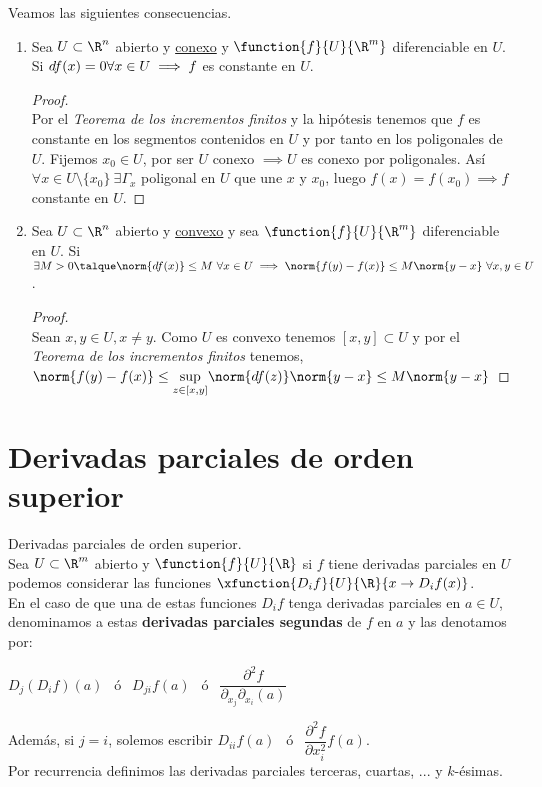 	\newpage
	\begin{corolario} Veamos las siguientes consecuencias.
	\begin{enumerate}[1)]
	\item Sea $U\subset\R^n$ abierto y \underline{conexo} y $\function{f}{U}{\R^m}$ diferenciable en $U$. Si $df(x)=0\\
	\forall x\in U\implies f$ es constante en $U$.
	\begin{proof}\ \\
	Por el \textit{Teorema de los incrementos finitos} y la hipótesis tenemos que $f$ es constante en los segmentos contenidos en $U$ y por tanto en los poligonales de $U$. Fijemos $x_0\in U$, por ser $U$ conexo $\implies U$ es conexo por poligonales. Así $\forall x\in U\setminus\{x_0\}\ \exists\Gamma_x$ poligonal en $U$ que une $x$ y $x_0$, luego $f(x)=f(x_0)\implies f$ constante en $U$.
	\end{proof}
	\item Sea $U\subset\R^n$ abierto y \underline{convexo} y sea $\function{f}{U}{\R^m}$ diferenciable en $U$. Si\\
	$\exists M>0\talque \norm{df(x)}\leq M\ \forall x\in U\implies \norm{f(y)-f(x)}\leq M\norm{y-x}\ \forall x,y\in U$.
	\begin{proof}\ \\
	Sean $x,y\in U, x\neq y$. Como $U$ es convexo tenemos $[x,y]\subset U$ y por el \textit{Teorema de los incrementos finitos} tenemos, $\norm{f(y)-f(x)}\leq \underset{z\in [x,y]}\sup\norm{df(z)}\norm{y-x}\leq M\norm{y-x}$
	\end{proof}
	\end{enumerate}
	\end{corolario}
	
	\section{Derivadas parciales de orden superior}
	
	\begin{defi} Derivadas parciales de orden superior.\\
	Sea $U\subset \R^m$ abierto y $\function{f}{U}{\R}$ si $f$ tiene derivadas parciales en $U$ podemos considerar las funciones $\xfunction{D_if}{U}{\R}{x\to D_if(x)}$.\\
	En el caso de que una de estas funciones $D_if$ tenga derivadas parciales en $a\in U$, denominamos a estas \textbf{derivadas parciales segundas} de $f$ en $a$ y las denotamos por:
	\begin{center} $D_j(D_if)(a)\ \ $ ó $\ \ D_{ji}f(a)\ \ $ ó $\ \ \dfrac{\partial^2f}{\partial_{x_j}\partial_{x_i}(a)}$\end{center}
	Además, si $j=i$, solemos escribir $D_{ii}f(a)\ \ $ ó $\ \ \dfrac{\partial^2f}{\partial x^2_i}f(a)$.\\
	Por recurrencia definimos las derivadas parciales terceras, cuartas, ... y $k$-ésimas.
	\end{defi}
	

